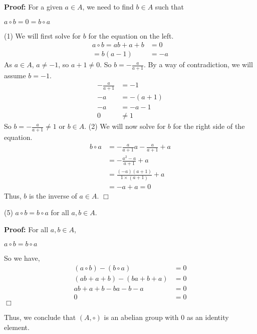 \documentclass[12pt]{article}
\begin{document}
\noindent
\textbf{Proof:}
For a given $a \in A$, we need to find $b \in A$ such that
\begin{center}
  $a \circ b = 0 = b \circ a$
\end{center}

(1) We will first solve for $b$ for the equation on the left.
\begin{align}
  a \circ b = ab + a + b &= 0\\
  = b(a-1) &= -a
\end{align}
As $a \in A$, $a \neq -1$, so $a+1 \neq 0$. So $b = -\frac{a}{a+1}$.
By a way of contradiction, we will assume $b = -1$.
\begin{align}
  -\frac{a}{a+1} &= -1 \\
  -a &= -(a+1) \\
  -a &= -a-1 \\
  0 &\neq 1
\end{align}
So $b = -\frac{a}{a+1} \neq 1$ or $b \in A$.
(2) We will now solve for $b$ for the right side of the equation.
\begin{align}
  b \circ a &= -\frac{a}{a+1}a - \frac{a}{a+1}+a \\
            &= -\frac{a^2-a}{a+1}+a \\
            &= \frac{(-a)(a+1)}{1 \times (a+1)} +a \\
            &= -a + a = 0
\end{align}
Thus, $b$ is the inverse of $a \in A$. $\Box$


\noindent
(5) $a \circ b = b \circ a$ for all $a, b \in A$.

\noindent
\textbf{Proof:}
For all $a,b \in A$,
\begin{center}
  $a \circ b = b \circ a$
\end{center}
So we have,
\begin{align}
  (a \circ b) - (b \circ a) &= 0 \\
  (ab + a + b) - (ba + b + a) &= 0 \\
  ab + a + b - ba - b -a &= 0 \\
  0 &= 0
\end{align}
$\Box$

\noindent
Thus, we conclude that $(A, \circ)$ is an abelian group with $0$ as an identity element.
\end{document}
